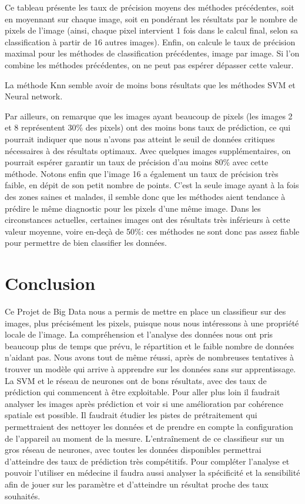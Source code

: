 \documentclass[a4paper,10pt]{report}
\begin{document}
Ce tableau présente les taux de précision moyens des méthodes précédentes, soit en moyennant sur chaque image, soit en pondérant les résultats par le nombre de pixels de l'image (ainsi, chaque pixel intervient 1 fois dans le calcul final, selon sa classification à partir de 16 autres images).
Enfin, on calcule le taux de précision maximal pour les méthodes de classification précédentes, image par image. Si l'on combine les méthodes précédentes, on ne peut pas espérer dépasser cette valeur.


La méthode Knn semble avoir de moins bons résultats que les méthodes SVM et Neural network. 

Par ailleurs, on remarque que les images ayant beaucoup de pixels (les images 2 et 8 représentent 30\% des pixels) ont des moins bons taux de prédiction, ce qui pourrait indiquer que nous n'avons pas atteint le seuil de données critiques nécessaires à des résultats optimaux. Avec quelques images supplémentaires, on pourrait espérer garantir un taux de précision d'au moins 80\% avec cette méthode. 
Notons enfin que l'image 16 a également un taux de précision très faible, en dépit de son petit nombre de points. C'est la seule image ayant à la fois des zones saines et malades, il semble donc que les méthodes aient tendance à prédire le même diagnostic pour les pixels d'une même image.
Dans les circonstances actuelles, certaines images ont des résultats très inférieurs à cette valeur moyenne, voire en-deçà de 50\%: ces méthodes ne sont donc pas assez fiable pour permettre de bien classifier les données.


\chapter*{Conclusion}
Ce Projet de Big Data nous a permis de mettre en place un classifieur sur des images, plus précisément les pixels, puisque nous nous intéressons à une propriété locale de l'image. La compréhension et l'analyse des données nous ont pris beaucoup plus de temps que prévu, le répartition et le faible nombre de données n'aidant pas. Nous avons tout de même réussi, après de nombreuses tentatives à trouver un modèle qui arrive à apprendre sur les données sans sur apprentissage. La SVM et le réseau de neurones ont de bons résultats, avec des taux de prédiction qui commencent à être exploitable. Pour aller plus loin il faudrait analyser les images après prédiction et voir si une amélioration par cohérence spatiale est possible. Il faudrait étudier les pistes de prétraitement qui permettraient des nettoyer les données et de prendre en compte la configuration de l'appareil au moment de la mesure. L’entraînement de ce classifieur sur un gros réseau de neurones, avec toutes les données disponibles permettrai d'atteindre des taux de prédiction très compétitifs. Pour compléter l'analyse et pouvoir l'utiliser en médecine il faudra aussi analyser la spécificité et la sensibilité afin de jouer sur les paramètre et d'atteindre un résultat proche des taux souhaités.

\tableofcontents
\listoffigures
\printindex
\end{document}
